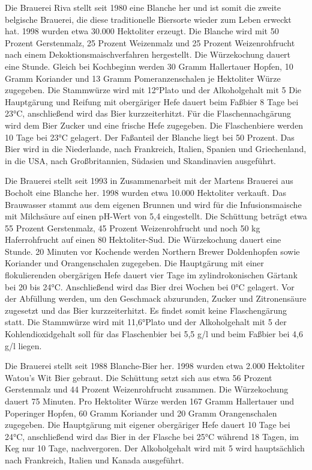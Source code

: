 \documentclass[a4paper,parskip=half]{scrartcl}
\begin{document}
\parencite[78]{Strottner1999}

Die Brauerei Riva stellt seit 1980 eine Blanche her und ist somit die zweite belgische
Brauerei, die diese traditionelle Biersorte wieder zum Leben erweckt hat. 1998
wurden etwa 30.000 Hektoliter erzeugt. Die Blanche wird mit 50 Prozent
Gerstenmalz, 25 Prozent Weizenmalz und 25 Prozent Weizenrohfrucht nach einem
Dekoktionsmaischverfahren hergestellt. Die Würzekochung dauert eine Stunde.
Gleich bei Kochbeginn werden 30 Gramm Hallertauer Hopfen, 10 Gramm Koriander
und 13 Gramm Pomeranzenschalen je
Hektoliter Würze zugegeben. Die
Stammwürze wird mit 12°Plato und der Alkoholgehalt mit 5 %
Die Hauptgärung und Reifung mit obergäriger Hefe dauert beim Faßbier 8 Tage bei
23°C, anschließend wird das Bier kurzzeiterhitzt. Für die Flaschennachgärung wird
dem Bier Zucker und eine frische Hefe zugegeben. Die Flaschenbiere werden
10 Tage bei 23°C gelagert.
Der Faßanteil der Blanche liegt bei 50 Prozent. Das Bier wird in die Niederlande,
nach
Frankreich,
Italien,
Spanien
und
Griechenland,
in
die
USA,
nach
Großbritannien, Südasien und Skandinavien ausgeführt.

\parencite[86\psq]{Strottner1999}

Die Brauerei stellt seit 1993 in Zusammenarbeit mit der Martens Brauerei aus
Bocholt eine Blanche her. 1998 wurden etwa 10.000 Hektoliter verkauft. Das
Brauwasser stammt aus dem eigenen Brunnen und wird für die Infusionsmaische mit
Milchsäure auf einen pH-Wert von 5,4 eingestellt.
Die Schüttung beträgt etwa 55 Prozent Gerstenmalz, 45 Prozent Weizenrohfrucht
und noch 50 kg Haferrohfrucht auf einen 80 Hektoliter-Sud.
Die Würzekochung dauert eine Stunde. 20 Minuten vor Kochende werden Northern
Brewer Doldenhopfen sowie Koriander und Orangenschalen zugegeben.
Die Hauptgärung mit einer flokulierenden obergärigen Hefe dauert vier Tage im
zylindrokonischen Gärtank bei 20 bis 24°C. Anschließend wird das Bier drei Wochen
bei 0°C gelagert. Vor der Abfüllung werden, um den Geschmack abzurunden, Zucker
und Zitronensäure zugesetzt und das Bier kurzzeiterhitzt. Es findet somit keine
Flaschengärung statt.
Die Stammwürze wird mit 11,6°Plato und der Alkoholgehalt mit 5 %
der Kohlendioxidgehalt soll für das Flaschenbier bei 5,5 g/l und beim Faßbier bei
4,6 g/l liegen.

\parencite[91]{Strottner1999}

Die Brauerei stellt seit 1988 Blanche-Bier her. 1998 wurden etwa 2.000 Hektoliter
Watou's Wit Bier gebraut. Die Schüttung setzt sich aus etwa 56 Prozent Gerstenmalz
und 44 Prozent Weizenrohfrucht zusammen. Die Würzekochung dauert 75 Minuten.
Pro Hektoliter Würze werden 167 Gramm Hallertauer und Poperinger Hopfen,
60 Gramm Koriander und 20 Gramm Orangenschalen zugegeben.
Die Hauptgärung mit eigener obergäriger Hefe dauert 10 Tage bei 24°C,
anschließend wird das Bier in der Flasche bei 25°C während 18 Tagen, im Keg nur
10 Tage, nachvergoren. Der Alkoholgehalt wird mit 5 %
wird hauptsächlich nach Frankreich, Italien und Kanada ausgeführt.
\end{document}
